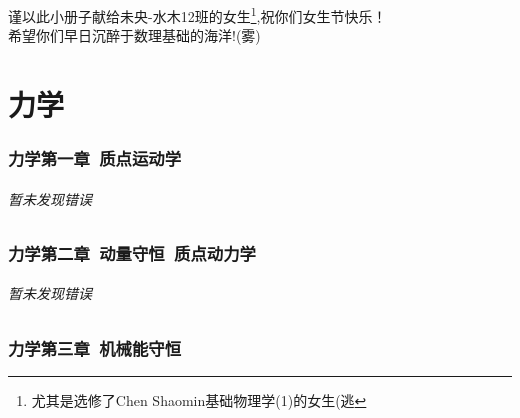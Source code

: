 \documentclass[a4paper,11pt]{ctexart}
\begin{document}
\section*{} 
    \begin{center}
     \large 谨以此小册子献给未央-水木12班的女生\footnote{尤其是选修了Chen Shaomin基础物理学(1)的女生(逃  },祝你们女生节快乐！\\希望你们早日沉醉于数理基础的海洋!(雾)
     
    \end{center}
    

\newpage
\tableofcontents
\newpage
\part{力学}
\section{力学第一章\ 质点运动学}
\paragraph{暂未发现错误}

\section{力学第二章\ 动量守恒\ 质点动力学}
\paragraph{暂未发现错误}

\section{力学第三章\ 机械能守恒}
\end{document}
